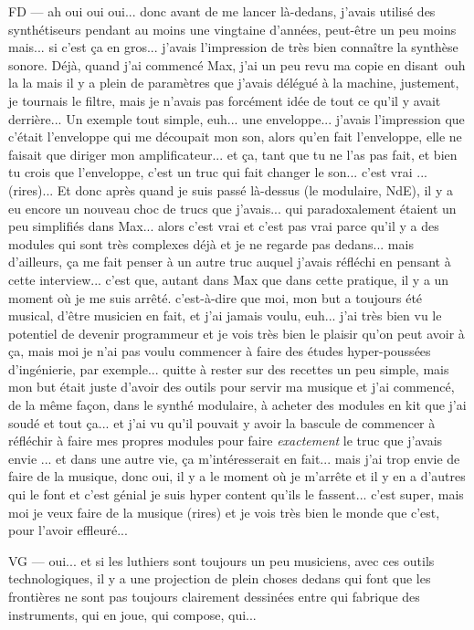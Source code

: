FD — ah oui oui oui... donc avant de me lancer là-dedans, j'avais utilisé des synthétiseurs pendant au moins une vingtaine d'années, peut-être un peu moins mais... si c'est ça en gros... j'avais l'impression de très bien connaître la synthèse sonore. Déjà, quand j'ai commencé Max, j'ai un peu revu ma copie en disant ouh la la mais il y a plein de paramètres que j'avais délégué à la machine, justement, je tournais le filtre, mais je n'avais pas forcément idée de tout ce qu'il y avait derrière... Un exemple tout simple, euh... une enveloppe... j'avais l'impression que c'était l'enveloppe qui me découpait mon son, alors qu'en fait l'enveloppe, elle ne faisait que diriger mon amplificateur... et ça, tant que tu ne l'as pas fait, et bien tu crois que l'enveloppe, c'est un truc qui fait changer le son... c'est vrai ... (rires)... Et donc après quand je suis passé là-dessus (le modulaire, NdE), il y a eu encore un nouveau choc de trucs que j'avais... qui paradoxalement étaient un peu simplifiés dans Max... alors c'est vrai et c'est pas vrai parce qu'il y a des modules qui sont très complexes déjà et je ne regarde pas dedans... mais d'ailleurs, ça me fait penser à un autre truc auquel j'avais réfléchi en pensant à cette interview... c'est que, autant dans Max que dans cette pratique, il y a un moment où je me suis arrêté. c'est-à-dire que moi, mon but a toujours été musical, d'être musicien en fait, et j'ai jamais voulu, euh... j'ai très bien vu le potentiel de devenir programmeur et je vois très bien le plaisir qu'on peut avoir à ça, mais moi je n'ai pas voulu commencer à faire des études hyper-poussées d'ingénierie, par exemple... quitte à rester sur des recettes un peu simple, mais mon but était juste d'avoir des outils pour servir ma musique et j'ai commencé, de la même façon, dans le synthé modulaire, à acheter des modules en kit que j'ai soudé et tout ça... et j'ai vu qu'il pouvait y avoir la bascule de commencer à réfléchir à faire mes propres modules pour faire \emph{exactement} le truc que j'avais envie ... et dans une autre vie, ça m'intéresserait en fait... mais j'ai trop envie de faire de la musique, donc oui, il y a le moment où je m'arrête et il y en a d'autres qui le font et c'est génial je suis hyper content qu'ils le fassent... c'est super, mais moi je veux faire de la musique (rires) et je vois très bien le monde que c'est, pour l'avoir effleuré... 

VG — oui... et si les luthiers sont toujours un peu musiciens, avec ces outils technologiques, il y a une projection de plein choses dedans qui font que les frontières ne sont pas toujours clairement dessinées entre qui fabrique des instruments, qui en joue, qui compose, qui... 

